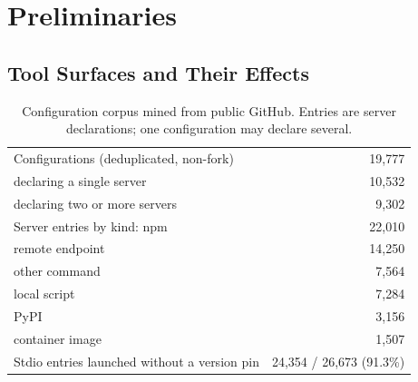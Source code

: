 \documentclass[acmsmall,screen,review,anonymous]{acmart}
\begin{document}
\section{Preliminaries}
\label{sec:prelim}

\subsection{Tool Surfaces and Their Effects}
\label{sec:prelim:surface}

\begin{table}[h]
\caption{Configuration corpus mined from public GitHub. Entries are server declarations; one configuration may declare several.}
\label{tab:corpus}
\begin{tabular}{lr}
\toprule
Configurations (deduplicated, non-fork) & 19,777 \\
\quad declaring a single server & 10,532 \\
\quad declaring two or more servers & 9,302 \\
\midrule
Server entries by kind: npm & 22,010 \\
\quad remote endpoint & 14,250 \\
\quad other command & 7,564 \\
\quad local script & 7,284 \\
\quad PyPI & 3,156 \\
\quad container image & 1,507 \\
\midrule
Stdio entries launched without a version pin & 24,354 / 26,673 (91.3\%) \\
\bottomrule
\end{tabular}
\end{table}
\end{document}
